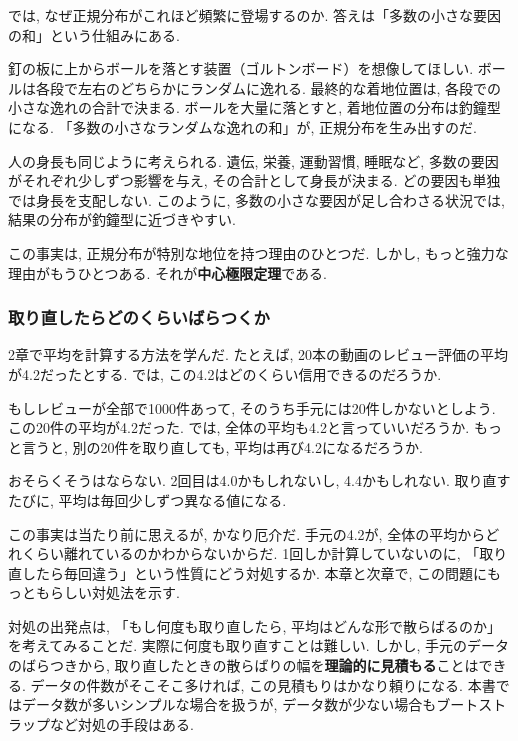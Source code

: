     では, なぜ正規分布がこれほど頻繁に登場するのか.
    答えは「多数の小さな要因の和」という仕組みにある.

    釘の板に上からボールを落とす装置（ゴルトンボード）を想像してほしい.
    ボールは各段で左右のどちらかにランダムに逸れる.
    最終的な着地位置は, 各段での小さな逸れの合計で決まる.
    ボールを大量に落とすと, 着地位置の分布は釣鐘型になる.
    「多数の小さなランダムな逸れの和」が, 正規分布を生み出すのだ.

    人の身長も同じように考えられる.
    遺伝, 栄養, 運動習慣, 睡眠など, 多数の要因がそれぞれ少しずつ影響を与え, その合計として身長が決まる.
    どの要因も単独では身長を支配しない.
    このように, 多数の小さな要因が足し合わさる状況では, 結果の分布が釣鐘型に近づきやすい.

    この事実は, 正規分布が特別な地位を持つ理由のひとつだ.
    しかし, もっと強力な理由がもうひとつある.
    それが\textbf{中心極限定理}である.

    \subsubsection{取り直したらどのくらいばらつくか}

    2章で平均を計算する方法を学んだ.
    たとえば, 20本の動画のレビュー評価の平均が4.2だったとする.
    では, この4.2はどのくらい信用できるのだろうか.

    もしレビューが全部で1000件あって, そのうち手元には20件しかないとしよう.
    この20件の平均が4.2だった.
    では, 全体の平均も4.2と言っていいだろうか.
    もっと言うと, 別の20件を取り直しても, 平均は再び4.2になるだろうか.

    おそらくそうはならない.
    2回目は4.0かもしれないし, 4.4かもしれない.
    取り直すたびに, 平均は毎回少しずつ異なる値になる.

    この事実は当たり前に思えるが, かなり厄介だ.
    手元の4.2が, 全体の平均からどれくらい離れているのかわからないからだ.
    1回しか計算していないのに, 「取り直したら毎回違う」という性質にどう対処するか.
    本章と次章で, この問題にもっともらしい対処法を示す.

    対処の出発点は, 「もし何度も取り直したら, 平均はどんな形で散らばるのか」を考えてみることだ.
    実際に何度も取り直すことは難しい.
    しかし, 手元のデータのばらつきから, 取り直したときの散らばりの幅を\textbf{理論的に見積もる}ことはできる.
    データの件数がそこそこ多ければ, この見積もりはかなり頼りになる.
    本書ではデータ数が多いシンプルな場合を扱うが, データ数が少ない場合もブートストラップなど対処の手段はある.

